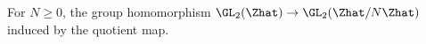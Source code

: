 For $N\ge0$, the group homomorphism $\GL_2(\Zhat)\to\GL_2(\Zhat/N\Zhat)$ induced by the quotient map.
